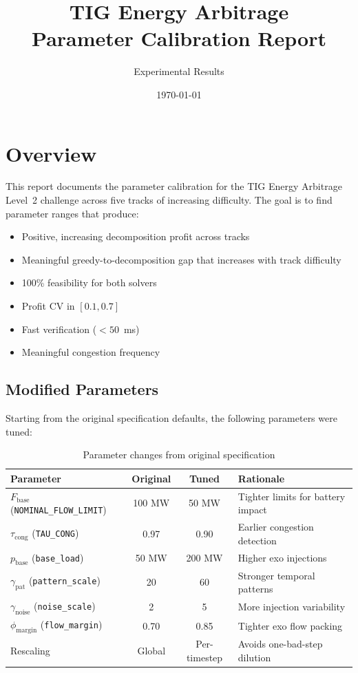 \documentclass[11pt,a4paper]{article}
\title{TIG Energy Arbitrage\\Parameter Calibration Report}
\author{Experimental Results}
\date{\today}
\begin{document}
\maketitle

\section{Overview}

This report documents the parameter calibration for the TIG Energy Arbitrage Level~2 challenge across five tracks of increasing difficulty. The goal is to find parameter ranges that produce:
\begin{itemize}
    \item Positive, increasing decomposition profit across tracks
    \item Meaningful greedy-to-decomposition gap that increases with track difficulty
    \item 100\% feasibility for both solvers
    \item Profit CV in $[0.1, 0.7]$
    \item Fast verification ($<50$~ms)
    \item Meaningful congestion frequency
\end{itemize}

\subsection{Modified Parameters}

Starting from the original specification defaults, the following parameters were tuned:

\begin{table}[h]
\centering
\caption{Parameter changes from original specification}
\label{tab:param-changes}
\begin{tabular}{lccl}
\toprule
\textbf{Parameter} & \textbf{Original} & \textbf{Tuned} & \textbf{Rationale} \\
\midrule
$F_{\mathrm{base}}$ (\texttt{NOMINAL\_FLOW\_LIMIT}) & 100 MW & 50 MW & Tighter limits for battery impact \\
$\tau_{\mathrm{cong}}$ (\texttt{TAU\_CONG}) & 0.97 & 0.90 & Earlier congestion detection \\
$p_{\mathrm{base}}$ (\texttt{base\_load}) & 50 MW & 200 MW & Higher exo injections \\
$\gamma_{\mathrm{pat}}$ (\texttt{pattern\_scale}) & 20 & 60 & Stronger temporal patterns \\
$\gamma_{\mathrm{noise}}$ (\texttt{noise\_scale}) & 2 & 5 & More injection variability \\
$\phi_{\mathrm{margin}}$ (\texttt{flow\_margin}) & 0.70 & 0.85 & Tighter exo flow packing \\
Rescaling & Global & Per-timestep & Avoids one-bad-step dilution \\
\bottomrule
\end{tabular}
\end{table}
\end{document}
